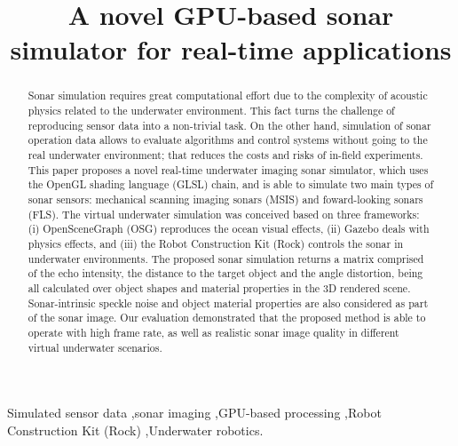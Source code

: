 \documentclass[final,5p,times]{elsarticle}
\begin{document}
\begin{frontmatter}


\title{A novel GPU-based sonar simulator for real-time applications}



\begin{abstract}

Sonar simulation requires great computational effort due to the complexity of acoustic physics related to the underwater environment. This fact turns the challenge of reproducing sensor data into a non-trivial task. On the other hand, simulation of sonar operation data allows to evaluate algorithms and control systems without going to the real underwater environment; that reduces the costs and risks of in-field experiments. This paper proposes a novel real-time underwater imaging sonar simulator, which uses the OpenGL shading language (GLSL) chain, and is able to simulate two main types of sonar sensors: mechanical scanning imaging sonars (MSIS) and foward-looking sonars (FLS). The virtual underwater simulation was conceived based on three frameworks: (i) OpenSceneGraph (OSG) reproduces the ocean visual effects, (ii) Gazebo deals with physics effects, and (iii) the Robot Construction Kit (Rock) controls the sonar in underwater environments. The proposed sonar simulation returns a matrix comprised of the echo intensity, the distance to the target object and the angle distortion, being all calculated over object shapes and material properties in the 3D rendered scene. Sonar-intrinsic speckle noise and object material properties are also considered as part of the sonar image. Our evaluation demonstrated that the proposed method is able to operate with high frame rate, as well as realistic sonar image quality in different virtual underwater scenarios.

\end{abstract}

\begin{keyword}
Simulated sensor data \sep sonar imaging \sep GPU-based processing \sep Robot Construction Kit (Rock) \sep Underwater robotics.

\end{keyword}

\end{frontmatter}
\end{document}
